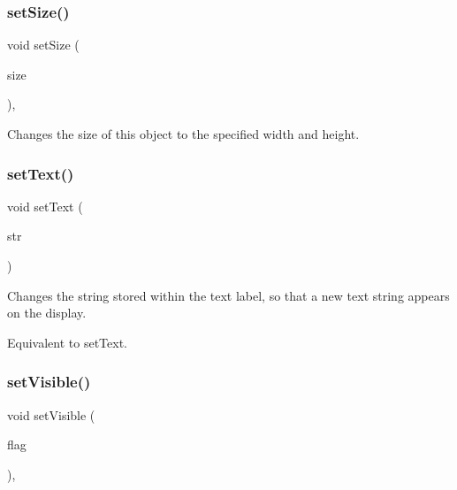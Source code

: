 \mbox{\label{classsgl_1_1GObject_ae2b628228f192c2702c4ce941b2af68f}} 
\subsubsection{\texorpdfstring{set\+Size()}{setSize()}\hspace{0.1cm}{\footnotesize\ttfamily [2/2]}}
{\footnotesize\ttfamily void set\+Size (\begin{DoxyParamCaption}\item[{const \mbox{\hyperlink{structsgl_1_1GDimension}{G\+Dimension}} \&}]{size }\end{DoxyParamCaption})\hspace{0.3cm}{\ttfamily [virtual]}, {\ttfamily [inherited]}}



Changes the size of this object to the specified width and height. 

\mbox{\label{classsgl_1_1GText_ac98cbe102af8aaf8fd017228d645bfda}} 
\subsubsection{\texorpdfstring{set\+Text()}{setText()}}
{\footnotesize\ttfamily void set\+Text (\begin{DoxyParamCaption}\item[{const std\+::string \&}]{str }\end{DoxyParamCaption})\hspace{0.3cm}{\ttfamily [virtual]}}



Changes the string stored within the text label, so that a new text string appears on the display. 

Equivalent to set\+Text. \mbox{\label{classsgl_1_1GObject_a88203f28224315d9f4471212f4af8ed3}} 
\subsubsection{\texorpdfstring{set\+Visible()}{setVisible()}}
{\footnotesize\ttfamily void set\+Visible (\begin{DoxyParamCaption}\item[{bool}]{flag }\end{DoxyParamCaption})\hspace{0.3cm}{\ttfamily [virtual]}, {\ttfamily [inherited]}}



